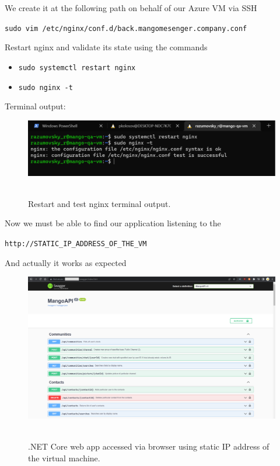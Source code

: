 We create it at the following path on behalf of our Azure VM via SSH
\begin{center}
    \texttt{sudo vim /etc/nginx/conf.d/back.mangomesenger.company.conf}
\end{center}
Restart nginx and validate its state using the commands
\begin{itemize}
    \item \texttt{sudo systemctl restart nginx}
    \item \texttt{sudo nginx -t}
\end{itemize}
Terminal output:
\begin{figure}[H]
    \centering
    \includegraphics[width=1\textwidth]{img/06_test_nginx}
    ~\caption{Restart and test nginx terminal output.}\label{fig:figure16}
\end{figure}
Now we must be able to find our application listening to the
\begin{center}
    \texttt{http://STATIC\_IP\_ADDRESS\_OF\_THE\_VM}
\end{center}
And actually it works as expected
\begin{figure}[H]
    \centering
    \includegraphics[width=1\textwidth]{img/06_view_in_browser}
    ~\caption{.NET Core web app accessed via browser using static IP address of the virtual machine.}\label{fig:figure17}
\end{figure}
